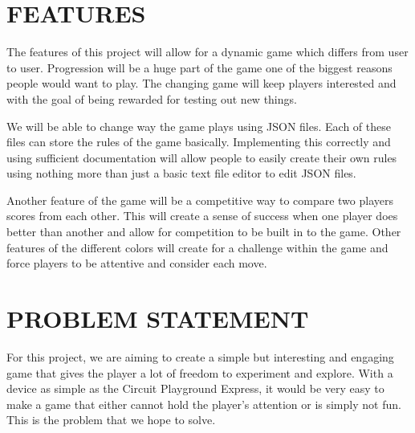 \documentclass[12pt]{article}
\begin{document}
\section{FEATURES}
The features of this project will allow for a dynamic game which differs from user to user. Progression will be a huge part of the game one of the biggest reasons people would want to play. The changing game will keep players interested and with the goal of being rewarded for testing out new things. 

We will be able to change way the game plays using JSON files.  Each of these files can store the rules of the game basically.  Implementing this correctly and using sufficient documentation will allow people to easily create their own rules using nothing more than just a basic text file editor to edit JSON files.  

Another feature of the game will be a competitive way to compare two players scores from each other. This will create a sense of success when one player does better than another and allow for competition to be built in to the game. Other features of the different colors will create for a challenge within the game and force players to be attentive and consider each move.  



\section{PROBLEM STATEMENT}
For this project, we are aiming to create a simple but interesting and engaging game that gives the player a lot of freedom to experiment and explore. With a device as simple as the Circuit Playground Express, it would be very easy to make a game that either cannot hold the player's attention or is simply not fun. This is the problem that we hope to solve.
\end{document}

